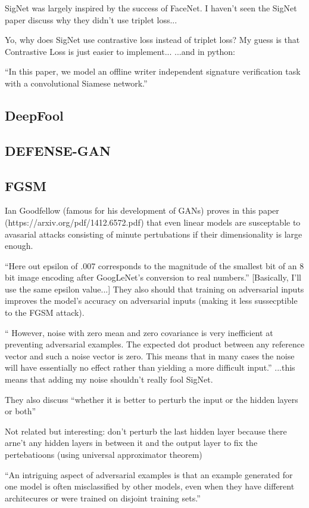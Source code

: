 SigNet was largely inspired by the success of FaceNet.
I haven't seen the SigNet paper discuss why they didn't use triplet loss...

Yo, why does SigNet use contrastive loss instead of triplet loss?
    My guess is that Contrastive Loss is just easier to implement...
\cite{sig_net}
\cite{GitHub_sounakdey}
...and in python: \cite{GitHub_signet_pytorch}

``In this paper, we model an offline writer independent
signature verification task with a convolutional Siamese network.''\cite{sig_net}

\subsection{DeepFool}
\subsection{DEFENSE-GAN}

\subsection{FGSM}
Ian Goodfellow (famous for his development of GANs) proves in this paper (https://arxiv.org/pdf/1412.6572.pdf) that even linear models are susceptable to avasarial attacks consisting of minute pertubations if their dimensionality is large enough.

``Here out epsilon of .007 corresponds to the magnitude of the
smallest bit of an 8 bit image encoding after GoogLeNet's conversion to real numbers.''
[Basically, I'll use the same epsilon value...]
They also should that training on adversarial inputs improves the model's accuracy on adversarial inputs (making it less sussecptible to the FGSM attack).

`` However, noise
with zero mean and zero covariance is very inefficient at preventing adversarial examples. The
expected dot product between any reference vector and such a noise vector is zero. This means that
in many cases the noise will have essentially no effect rather than yielding a more difficult input.''
...this means that adding my noise shouldn't really fool SigNet.

They also discuss ``whether it is better to perturb the input or the hidden layers or both''

Not related but interesting: don't perturb the last hidden layer because there arne't any hidden layers in between it and the output layer to fix the pertebatioons (using  universal approximator theorem)

``An intriguing aspect of adversarial examples is that an example generated for one model is often
misclassified by other models, even when they have different architecures or were trained on disjoint training sets.''
